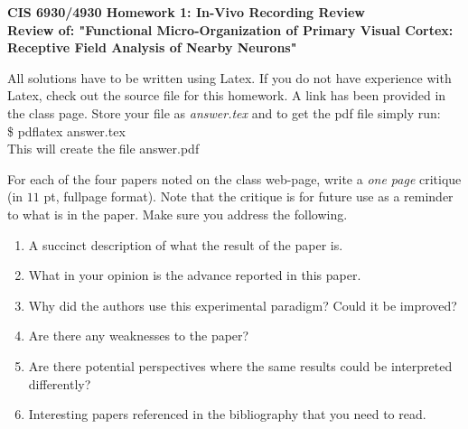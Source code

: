 \documentclass[11pt]{article}
\begin{document}
\begin{center}
{\large {\bf CIS 6930/4930 Homework 1: In-Vivo Recording Review}}\\
{\normalsize {\bf Review of: "Functional Micro-Organization of Primary Visual Cortex: Receptive
Field Analysis of Nearby Neurons"}}
\end{center}

All solutions have to be written using Latex. If you do not have experience
with Latex, check out the source file for this homework. A link has been
provided in the class page. Store your file as {\em answer.tex} and to get
the pdf file simply run:\\
\$ pdflatex answer.tex\\
This will create the file answer.pdf

For each of the four papers noted on the class web-page, write a {\em one page}
critique (in $11$ pt, fullpage format). Note that the critique is for future
use as a reminder to what is in the paper. Make sure you address the following.

\begin{enumerate}
\item A succinct description of what the result of the paper is.
\item What in your opinion is the advance reported in this paper.
\item Why did the authors use this experimental paradigm? Could it be improved?
\item Are there any weaknesses to the paper?
\item Are there potential perspectives where the same results could be
interpreted differently?
\item Interesting papers referenced in the bibliography that you need to read.
\end{enumerate}
\end{document}
